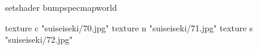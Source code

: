setshader bumpspecmapworld

    texture c "suiseiseki/70.jpg"
    texture n "suiseiseki/71.jpg"
    texture s "suiseiseki/72.jpg"
